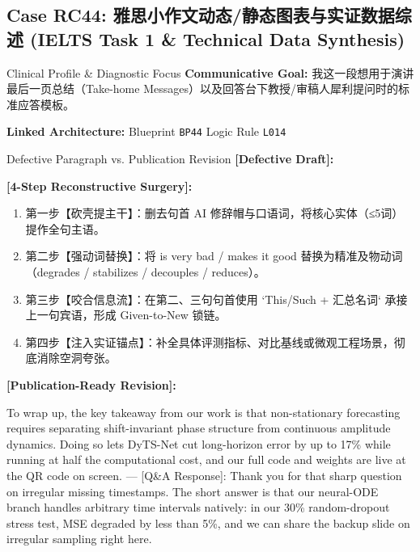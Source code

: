 \subsection{Case RC44: 雅思小作文动态/静态图表与实证数据综述 (IELTS Task 1 \& Technical Data Synthesis)}\label{case:RC44}
\begin{ConceptBox}{Clinical Profile \& Diagnostic Focus}
\textbf{Communicative Goal:} 我这一段想用于演讲最后一页总结（Take-home Messages）以及回答台下教授/审稿人犀利提问时的标准应答模板。\par
\textbf{Linked Architecture:} Blueprint \texttt{BP44} \enspace\textbar\enspace Logic Rule \texttt{L014}
\end{ConceptBox}
\begin{ExampleBox}{Defective Paragraph vs. Publication Revision}
\textbf{\color{TargetHighlight}[Defective Draft]:}\par
{}\par\vspace{6pt}
\textbf{\color{AcadForest}[4-Step Reconstructive Surgery]:}
\begin{enumerate}[label=\textbf{\color{AcadNavy}Step \arabic*:}, leftmargin=2em]
  \item 第一步【砍壳提主干】：删去句首 AI 修辞帽与口语词，将核心实体（≤5词）提作全句主语。
  \item 第二步【强动词替换】：将 is very bad / makes it good 替换为精准及物动词（degrades / stabilizes / decouples / reduces）。
  \item 第三步【咬合信息流】：在第二、三句句首使用 `This/Such + 汇总名词` 承接上一句宾语，形成 Given-to-New 锁链。
  \item 第四步【注入实证锚点】：补全具体评测指标、对比基线或微观工程场景，彻底消除空洞夸张。
\end{enumerate}\vspace{4pt}
\textbf{\color{AcadNavy}[Publication-Ready Revision]:}\par
To wrap up, the key takeaway from our work is that non-stationary forecasting requires separating shift-invariant phase structure from continuous amplitude dynamics. Doing so lets DyTS-Net cut long-horizon error by up to 17\% while running at half the computational cost, and our full code and weights are live at the QR code on screen. --- [Q\&A Response]: Thank you for that sharp question on irregular missing timestamps. The short answer is that our neural-ODE branch handles arbitrary time intervals natively: in our 30\% random-dropout stress test, MSE degraded by less than 5\%, and we can share the backup slide on irregular sampling right here.
\end{ExampleBox}

